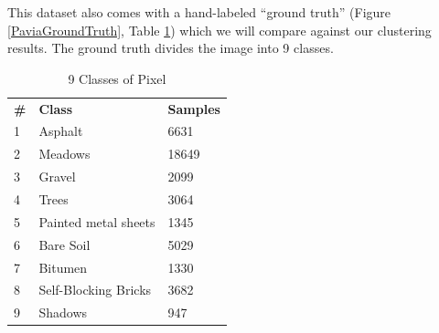 \documentclass[12pt]{article}
\begin{document}
This dataset also comes with a hand-labeled ``ground truth'' (Figure \ref{PaviaGroundTruth}, Table \ref{table:PaviaGroundTruth}) which we will compare against our clustering results. The ground truth divides the image into 9 classes. 

\begin{table}
\centering
\label{table:PaviaGroundTruth}
\begin{tabular}{l l l}
\textbf{\#} & \textbf{Class} & \textbf{Samples}\\
1 & Asphalt & 6631 \\
2 & Meadows & 18649 \\
3 & Gravel & 2099 \\
4 & Trees & 3064 \\ 
5 & Painted metal sheets & 1345 \\
6 & Bare Soil & 5029 \\
7 & Bitumen & 1330 \\
8 & Self-Blocking Bricks & 3682 \\
9 & Shadows & 947 \\
\end{tabular}
\caption{9 Classes of Pixel}
\end{table}
\end{document}
